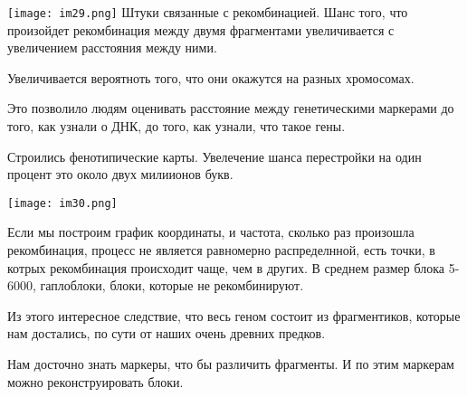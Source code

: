 \texttt{[image: im29.png]}
Штуки связанные с рекомбинацией. Шанс того, что произойдет 
рекомбинация между двумя фрагментами увеличивается с увеличением расстояния между ними. 

Увеличивается вероятноть того, что они окажутся на разных хромосомах. 

Это позволило людям оценивать расстояние между генетическими маркерами до того, 
как узнали о ДНК, до того, как узнали, что такое гены.

Строились фенотипические карты. Увелечение шанса перестройки на один процент это около двух милиионов букв. 

\texttt{[image: im30.png]}

Если мы построим график координаты, и частота, сколько раз произошла рекомбинация, 
процесс не является равномерно распределнной, есть точки, в котрых рекомбинация происходит 
чаще, чем в других. В среднем размер блока 5-6000, гаплоблоки, блоки, которые не рекомбинируют. 

Из этого интересное следствие, что весь геном состоит из фрагментиков, 
которые нам достались, по сути от наших очень древних предков. 

Нам досточно знать маркеры, что бы различить фрагменты. И по этим маркерам 
можно реконструировать блоки. 

